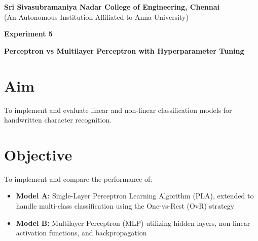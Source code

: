\documentclass[11pt]{article}
\begin{document}
\begin{center}
    \large \textbf{Sri Sivasubramaniya Nadar College of Engineering, Chennai} \\
    (An Autonomous Institution Affiliated to Anna University) \\
    \vspace{0.3cm}
\end{center}
\begin{table}[h]
\renewcommand{\arraystretch}{1.4}
\end{table}


\begin{center}
    \textbf{\Large Experiment 5}
\end{center}

\begin{center}
    \textbf{Perceptron vs Multilayer Perceptron with Hyperparameter Tuning}
\end{center}

\section*{Aim}
To implement and evaluate linear and non-linear classification models for handwritten character recognition.

\section*{Objective}
To implement and compare the performance of:
\begin{itemize}
    \item \textbf{Model A:} Single-Layer Perceptron Learning Algorithm (PLA), extended to handle multi-class classification using the One-vs-Rest (OvR) strategy
    \item \textbf{Model B:} Multilayer Perceptron (MLP) utilizing hidden layers, non-linear activation functions, and backpropagation
\end{itemize}
\end{document}
